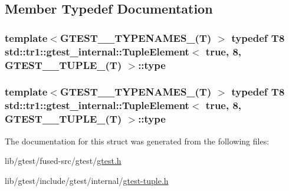 \subsection{Member Typedef Documentation}
\hypertarget{structstd_1_1tr1_1_1gtest__internal_1_1_tuple_element_3_01true_00_018_00_01_g_t_e_s_t__10___t_u_p_l_e___07_t_08_01_4_a7b4d456a790291b651b4179650754587}{
\subsubsection[{type}]{\setlength{\rightskip}{0pt plus 5cm}template$<$G\-T\-E\-S\-T\-\_\-\_\-\-T\-Y\-P\-E\-N\-A\-M\-E\-S\-\_\-(\-T) $>$ typedef T8 {\bf std\-::tr1\-::gtest\-\_\-internal\-::\-Tuple\-Element}$<$ true, 8, {\bf G\-T\-E\-S\-T\-\_\-\_\-\-T\-U\-P\-L\-E\-\_\-}(T) $>$\-::{\bf type}}}\label{structstd_1_1tr1_1_1gtest__internal_1_1_tuple_element_3_01true_00_018_00_01_g_t_e_s_t__10___t_u_p_l_e___07_t_08_01_4_a7b4d456a790291b651b4179650754587}
\hypertarget{structstd_1_1tr1_1_1gtest__internal_1_1_tuple_element_3_01true_00_018_00_01_g_t_e_s_t__10___t_u_p_l_e___07_t_08_01_4_a7b4d456a790291b651b4179650754587}{
\subsubsection[{type}]{\setlength{\rightskip}{0pt plus 5cm}template$<$G\-T\-E\-S\-T\-\_\-\_\-\-T\-Y\-P\-E\-N\-A\-M\-E\-S\-\_\-(\-T) $>$ typedef T8 {\bf std\-::tr1\-::gtest\-\_\-internal\-::\-Tuple\-Element}$<$ true, 8, {\bf G\-T\-E\-S\-T\-\_\-\_\-\-T\-U\-P\-L\-E\-\_\-}(T) $>$\-::{\bf type}}}\label{structstd_1_1tr1_1_1gtest__internal_1_1_tuple_element_3_01true_00_018_00_01_g_t_e_s_t__10___t_u_p_l_e___07_t_08_01_4_a7b4d456a790291b651b4179650754587}


The documentation for this struct was generated from the following files\-:\begin{DoxyCompactItemize}
\item 
lib/gtest/fused-\/src/gtest/\hyperlink{fused-src_2gtest_2gtest_8h}{gtest.\-h}\item 
lib/gtest/include/gtest/internal/\hyperlink{gtest-tuple_8h}{gtest-\/tuple.\-h}\end{DoxyCompactItemize}
